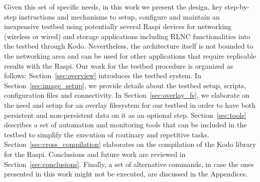 Given this set of specific needs, in this work we present the design, key step-by-step instructions and mechanisms to setup, configure and maintain an inexpensive testbed using potentially several \ac{Raspi} devices for networking (wireless or wired) and storage applications including \ac{RLNC} functionalities into the testbed through Kodo. Nevertheless, the architecture itself is not bounded to the networking area and can be used for other applications that require replicable results with the \ac{Raspi}. Our work for the testbed procedure is organized as follows: Section~\ref{sec:overview} introduces the testbed system. In Section~\ref{sec:image_setup}, we provide details about the testbed setup, scripts, configuration files and connectivity. In Section~\ref{sec:overlay_fs}, we elaborate on the need and setup for an overlay filesystem for our testbed in order to have both persistent and non-persistent data on it as an optional step. Section~\ref{sec:tools} describes a set of automation and monitoring tools that can be included in the testbed to simplify the execution of routinary and repetitive tasks. Section~\ref{sec:cross_compilation} elaborates on the compilation of the Kodo library for the \ac{Raspi}. Conclusions and future work are reviewed in Section~\ref{sec:conclusions}. Finally, a set of alternative commands, in case the ones presented in this work might not be executed, are discussed in the Appendices.

